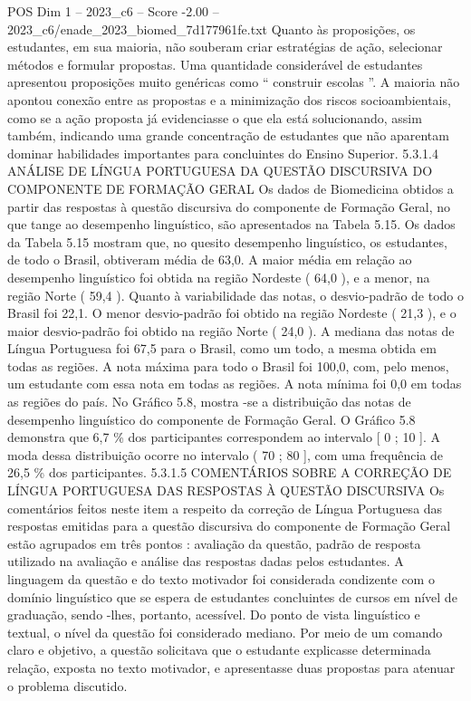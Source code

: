 \begin{textsample}{POS Dim 1 – 2023\_c6 – Score -2.00 – 2023\_c6/enade\_2023\_biomed\_7d177961fe.txt}
Quanto às proposições, os estudantes, em sua maioria, não souberam criar estratégias de ação, selecionar métodos e formular propostas.
Uma quantidade considerável de estudantes apresentou proposições muito genéricas como “ construir escolas ”.
A maioria não apontou conexão entre as propostas e a minimização dos riscos socioambientais, como se a ação proposta já evidenciasse o que ela está solucionando, assim também, indicando uma grande concentração de estudantes que não aparentam dominar habilidades importantes para concluintes do Ensino Superior. 5.3.1.4 ANÁLISE DE LÍNGUA PORTUGUESA DA QUESTÃO DISCURSIVA DO COMPONENTE DE FORMAÇÃO GERAL Os dados de Biomedicina obtidos a partir das respostas à questão discursiva do componente de Formação Geral, no que tange ao desempenho linguístico, são apresentados na Tabela 5.15.
Os dados da Tabela 5.15 mostram que, no quesito desempenho linguístico, os estudantes, de todo o Brasil, obtiveram média de 63,0.
A maior média em relação ao desempenho linguístico foi obtida na região Nordeste ( 64,0 ), e a menor, na região Norte ( 59,4 ).
Quanto à variabilidade das notas, o desvio-padrão de todo o Brasil foi 22,1.
O menor desvio-padrão foi obtido na região Nordeste ( 21,3 ), e o maior desvio-padrão foi obtido na região Norte ( 24,0 ).
A mediana das notas de Língua Portuguesa foi 67,5 para o Brasil, como um todo, a mesma obtida em todas as regiões.
A nota máxima para todo o Brasil foi 100,0, com, pelo menos, um estudante com essa nota em todas as regiões.
A nota mínima foi 0,0 em todas as regiões do país.
No Gráfico 5.8, mostra -se a distribuição das notas de desempenho linguístico do componente de Formação Geral.
O Gráfico 5.8 demonstra que 6,7 \% dos participantes correspondem ao intervalo [ 0 ; 10 ].
A moda dessa distribuição ocorre no intervalo ( 70 ; 80 ], com uma frequência de 26,5 \% dos participantes. 5.3.1.5 COMENTÁRIOS SOBRE A CORREÇÃO DE LÍNGUA PORTUGUESA DAS RESPOSTAS À QUESTÃO DISCURSIVA Os comentários feitos neste item a respeito da correção de Língua Portuguesa das respostas emitidas para a questão discursiva do componente de Formação Geral estão agrupados em três pontos : avaliação da questão, padrão de resposta utilizado na avaliação e análise das respostas dadas pelos estudantes.
A linguagem da questão e do texto motivador foi considerada condizente com o domínio linguístico que se espera de estudantes concluintes de cursos em nível de graduação, sendo -lhes, portanto, acessível.
Do ponto de vista linguístico e textual, o nível da questão foi considerado mediano.
Por meio de um comando claro e objetivo, a questão solicitava que o estudante explicasse determinada relação, exposta no texto motivador, e apresentasse duas propostas para atenuar o problema discutido.

\end{textsample}

